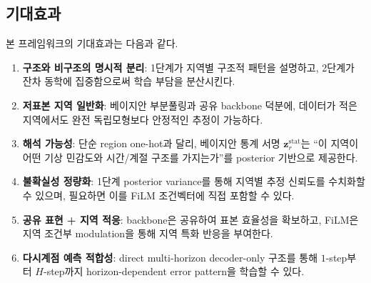 \documentclass[11pt,a4paper]{article}
\begin{document}
\subsection{기대효과}
본 프레임워크의 기대효과는 다음과 같다.
\begin{enumerate}[label=(\arabic*)]
    \item \textbf{구조와 비구조의 명시적 분리}: 1단계가 지역별 구조적 패턴을 설명하고, 2단계가 잔차 동학에 집중함으로써 학습 부담을 분산시킨다.
    \item \textbf{저표본 지역 일반화}: 베이지안 부분풀링과 공유 backbone 덕분에, 데이터가 적은 지역에서도 완전 독립모형보다 안정적인 추정이 가능하다.
    \item \textbf{해석 가능성}: 단순 region one-hot과 달리, 베이지안 통계 서명 $\bm z_r^{\mathrm{stat}}$는 ``이 지역이 어떤 기상 민감도와 시간/계절 구조를 가지는가''를 posterior 기반으로 제공한다.
    \item \textbf{불확실성 정량화}: 1단계 posterior variance를 통해 지역별 추정 신뢰도를 수치화할 수 있으며, 필요하면 이를 FiLM 조건벡터에 직접 포함할 수 있다.
    \item \textbf{공유 표현 + 지역 적응}: backbone은 공유하여 표본 효율성을 확보하고, FiLM은 지역 조건부 modulation을 통해 지역 특화 반응을 부여한다.
    \item \textbf{다시계점 예측 적합성}: direct multi-horizon decoder-only 구조를 통해 $1$-step부터 $H$-step까지 horizon-dependent error pattern을 학습할 수 있다.
\end{enumerate}
\end{document}
